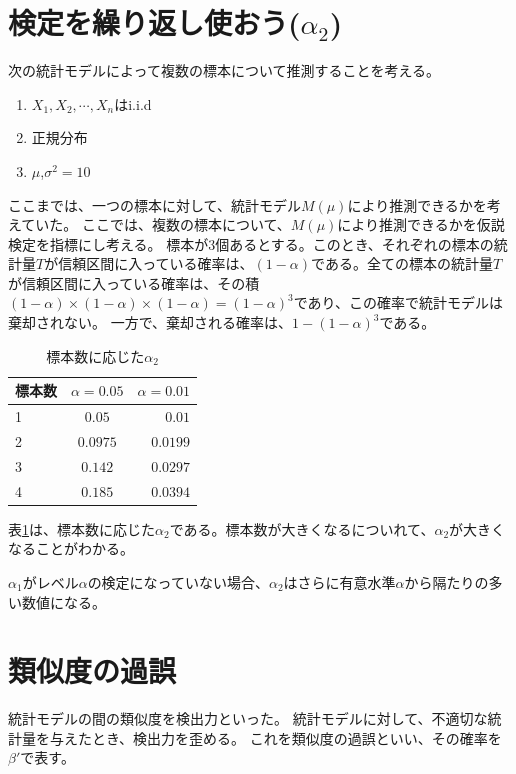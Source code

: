 \section{検定を繰り返し使おう($\alpha_2$)}
次の統計モデルによって複数の標本について推測することを考える。
\begin{enumerate}
    \item $X_1,X_2,\cdots,X_n $はi.i.d
    \item 正規分布
    \item $\mu$,$\sigma^2=10$
\end{enumerate}
ここまでは、一つの標本に対して、統計モデル$M(\mu)$により推測できるかを考えていた。
ここでは、複数の標本について、$M(\mu)$により推測できるかを仮説検定を指標にし考える。
標本が$3$個あるとする。このとき、それぞれの標本の統計量$T$が信頼区間に入っている確率は、$(1-\alpha)$である。全ての標本の統計量$T$が信頼区間に入っている確率は、その積$(1-\alpha)\times(1-\alpha)\times(1-\alpha)=(1-\alpha)^3$であり、この確率で統計モデルは棄却されない。
一方で、棄却される確率は、$1-(1-\alpha)^3$である。
\begin{table}[hbtp]
    \caption{標本数に応じた$\alpha_2$}
    \label{table:multiple_test_reject_prob}
    \centering
    \begin{tabular}{lcr}
      \hline
      標本数  & $\alpha=0.05$  &  $\alpha=0.01$ \\
      \hline \hline
       1 & $0.05$  & $0.01$ \\
       2 & $0.0975$ & $0.0199$\\
       3 & $0.142$ & $0.0297$\\
       4 & $0.185$ & $0.0394$\\
    \end{tabular}
  \end{table}
表\ref{table:multiple_test_reject_prob}は、標本数に応じた$\alpha_2$である。標本数が大きくなるについれて、$\alpha_2$が大きくなることがわかる。

$\alpha_1$がレベル$\alpha$の検定になっていない場合、$\alpha_2$はさらに有意水準$\alpha$から隔たりの多い数値になる。




\section{類似度の過誤}
統計モデルの間の類似度を検出力といった。
統計モデルに対して、不適切な統計量を与えたとき、検出力を歪める。
これを類似度の過誤といい、その確率を$\beta'$で表す。
    